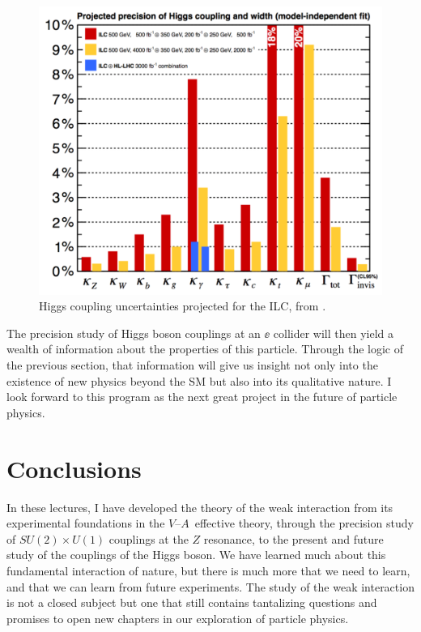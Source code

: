 \documentclass[12pt]{article}
\def\VmA{ $V$--$A$}
\begin{document}
\begin{figure}
\begin{center}
\includegraphics[width=0.85\hsize]{Higgsprojection.pdf}
\end{center}
\caption{Higgs coupling uncertainties projected for the ILC, from \cite{ILCcase}.}
\label{fig:Higgsacc}
\end{figure}



The precision study of Higgs boson couplings at an $\ee$ collider will
then yield a wealth of information about the properties of this
particle.  Through the logic of the previous section, that information
will give us insight not only into the existence of new physics beyond
the SM but also into its qualitative nature.
I look forward to this program as the next great
 project in the future of particle physics.

\section{Conclusions}

In these lectures, I have developed the theory of the weak interaction
from its experimental foundations in the \VmA\ effective theory,
through the precision study of $SU(2)\times U(1)$ couplings at the $Z$
resonance, to the present and future study of the couplings of the
Higgs boson.   We have learned much about this fundamental interaction
of nature, but there is much more that we need to learn, and that we can
learn from future experiments.   The study of the weak interaction is
not a closed subject but one that still contains tantalizing questions
and promises to open new chapters in our exploration of particle
physics.
\end{document}
